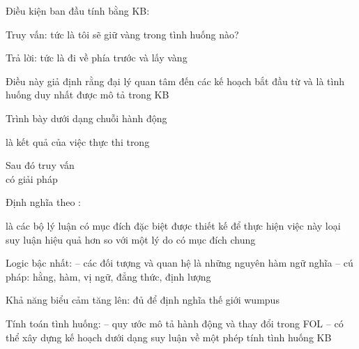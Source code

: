 \documentclass{article}
\begin{document}
\begin{huge}

Điều kiện ban đầu tính bằng KB:\nl
   \nl

Truy vấn: \nl
   tức là tôi sẽ giữ vàng trong tình huống nào?

Trả lời: \nl
   tức là đi về phía trước và lấy vàng

Điều này giả định rằng đại lý quan tâm đến các kế hoạch bắt đầu từ 
và  là tình huống duy nhất được mô tả trong KB



Trình bày  dưới dạng chuỗi hành động \mat{$[a_1,a_2,\ldots,a_n]$}

 là kết quả của việc thực thi  trong 

Sau đó truy vấn \\
có giải pháp 

Định nghĩa  theo :\al
   \al

 là các bộ lý luận có mục đích đặc biệt được thiết kế để thực hiện việc này
loại suy luận hiệu quả hơn so với một lý do có mục đích chung


Logic bậc nhất: \al
-- các đối tượng và quan hệ là những nguyên hàm ngữ nghĩa\al
-- cú pháp: hằng, hàm, vị ngữ, đẳng thức, định lượng

Khả năng biểu cảm tăng lên: đủ để định nghĩa thế giới wumpus 

Tính toán tình huống:\al
-- quy ước mô tả hành động và thay đổi trong FOL\al
-- có thể xây dựng kế hoạch dưới dạng suy luận về một phép tính tình huống KB


\end{huge} 
\end{document}
